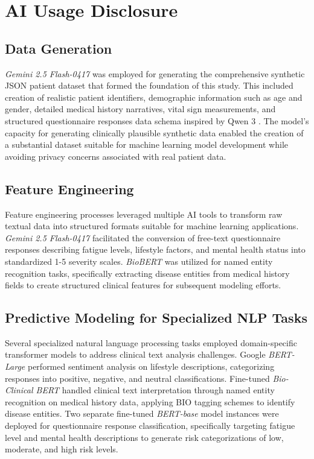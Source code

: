\section{AI Usage Disclosure}

\subsection{Data Generation}

\textit{Gemini 2.5 Flash-0417} \parencite{Doshi_2025} was employed for generating the comprehensive synthetic JSON patient dataset that formed the foundation of this study. This included creation of realistic patient identifiers, demographic information such as age and gender, detailed medical history narratives, vital sign measurements, and structured questionnaire responses data schema inspired by Qwen 3 \parencite{yang2025qwen3technicalreport}. The model's capacity for generating clinically plausible synthetic data enabled the creation of a substantial dataset suitable for machine learning model development while avoiding privacy concerns associated with real patient data.

\subsection{Feature Engineering}

Feature engineering processes leveraged multiple AI tools to transform raw textual data into structured formats suitable for machine learning applications. \textit{Gemini 2.5 Flash-0417} \parencite{Doshi_2025} facilitated the conversion of free-text questionnaire responses describing fatigue levels, lifestyle factors, and mental health status into standardized 1-5 severity scales. \textit{BioBERT} \parencite{Lee_2019} was utilized for named entity recognition tasks, specifically extracting disease entities from medical history fields to create structured clinical features for subsequent modeling efforts.

\subsection{Predictive Modeling for Specialized NLP Tasks}

Several specialized natural language processing tasks employed domain-specific transformer models to address clinical text analysis challenges. Google \textit{BERT-Large} \parencite{devlin2019bertpretrainingdeepbidirectional} performed sentiment analysis on lifestyle descriptions, categorizing responses into positive, negative, and neutral classifications. Fine-tuned \textit{Bio-Clinical BERT} \parencite{ling2023bioclinicalbertbertbase} handled clinical text interpretation through named entity recognition on medical history data, applying BIO tagging schemes to identify disease entities. Two separate fine-tuned \textit{BERT-base} model \parencite{devlin2019bertpretrainingdeepbidirectional} instances were deployed for questionnaire response classification, specifically targeting fatigue level and mental health descriptions to generate risk categorizations of low, moderate, and high risk levels.

